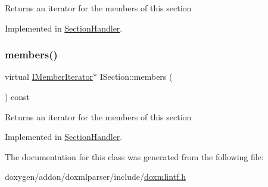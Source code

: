 Returns an iterator for the members of this section 

Implemented in \mbox{\hyperlink{class_section_handler_a6e8854663f76206dfa65428e0bdc5b51}{Section\+Handler}}.

\mbox{\label{class_i_section_a1980a8501eb0adbc12f00e251210c39e}} 
\subsubsection{\texorpdfstring{members()}{members()}\hspace{0.1cm}{\footnotesize\ttfamily [2/2]}}
{\footnotesize\ttfamily virtual \mbox{\hyperlink{class_i_member_iterator}{I\+Member\+Iterator}}$\ast$ I\+Section\+::members (\begin{DoxyParamCaption}{ }\end{DoxyParamCaption}) const\hspace{0.3cm}{\ttfamily [pure virtual]}}

Returns an iterator for the members of this section 

Implemented in \mbox{\hyperlink{class_section_handler_a6e8854663f76206dfa65428e0bdc5b51}{Section\+Handler}}.



The documentation for this class was generated from the following file\+:\begin{DoxyCompactItemize}
\item 
doxygen/addon/doxmlparser/include/\mbox{\hyperlink{include_2doxmlintf_8h}{doxmlintf.\+h}}\end{DoxyCompactItemize}
